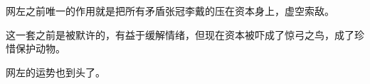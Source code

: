 \begin{zhihuanswer}
网左之前唯一的作用就是把所有矛盾张冠李戴的压在资本身上，虚空索敌。

这一套之前是被默许的，有益于缓解情绪，但现在资本被吓成了惊弓之鸟，成了珍惜保护动物。

网左的运势也到头了。
\end{zhihuanswer}
